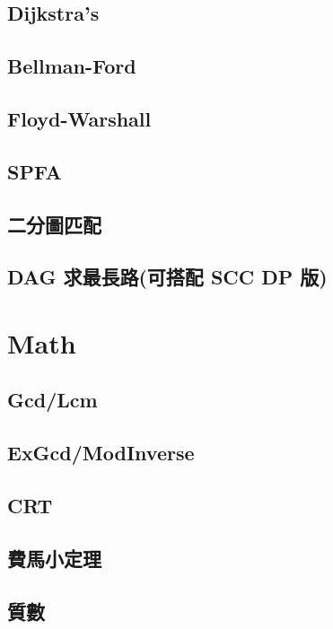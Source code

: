	\subsection{Dijkstra’s}
		
	\subsection{Bellman-Ford}
		
	\subsection{Floyd-Warshall}
		
	\subsection{SPFA}
		
	\subsection{二分圖匹配}
		
	\subsection{DAG 求最長路(可搭配 SCC DP 版)}
		
\section{Math}
	\subsection{Gcd/Lcm}
		
	\subsection{ExGcd/ModInverse}
		
	\subsection{CRT}
		
	\subsection{費馬小定理}
		
	\subsection{質數}
